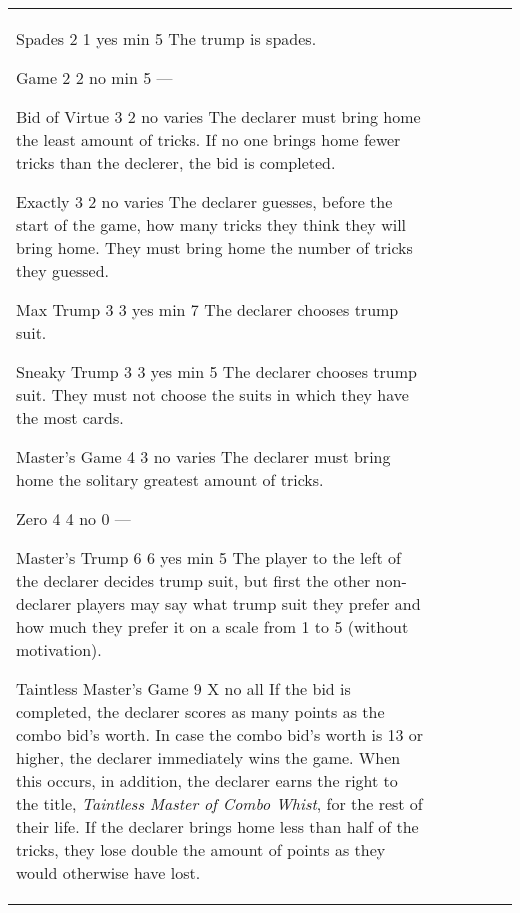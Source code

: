 \begin{table}
\begin{center}
\begin{tabularx}{\textwidth}{
			l
			S[table-number-alignment=center, table-format=1.0]
			S[table-number-alignment=center, table-format=1.0]
			cc|X
		}
				\standardBidItem%
				{Spades}
				{2}
				{1}
				{yes}
				{min 5}
				{%
					The trump is spades.
				}

				\standardBidItem%
				{Game}
				{2}
				{2}
				{no}
				{min 5}
				{%
					---
				}

				\standardBidItem%
				{Bid of Virtue}
				{3}
				{2}
				{no}
				{varies}
				{%
					The declarer must bring home the least amount of tricks. If no one brings home fewer tricks than the declerer, the bid is completed.
				}

				\standardBidItem%
				{Exactly}
				{3}
				{2}
				{no}
				{varies}
				{%
					The declarer guesses, before the start of the game, how many tricks they think they will bring home. They must bring home the number of tricks they guessed.
				}

				\standardBidItem%
				{Max Trump}
				{3}
				{3}
				{yes}
				{min 7}
				{%
					The declarer chooses trump suit.
				}

				\standardBidItem%
				{Sneaky Trump}
				{3}
				{3}
				{yes}
				{min 5}
				{%
					The declarer chooses trump suit. They must not choose the suits in which they have the most cards.
				}

				\standardBidItem%
				{Master's Game}
				{4}
				{3}
				{no}
				{varies}
				{%
					The declarer must bring home the solitary greatest amount of tricks.
				}

				\standardBidItem%
				{Zero}
				{4}
				{4}
				{no}
				{0}
				{%
					---
				}

				\standardBidItem%
				{Master's Trump}
				{6}
				{6}
				{yes}
				{min 5}
				{%
					The player to the left of the declarer decides trump suit, but first the other non-declarer players may say what trump suit they prefer and how much they prefer it on a scale from 1 to 5 (without motivation).
				}

				\standardBidItem%
				{Taintless Master's Game}
				{9}
				{X}
				{no}
				{all}
				{%
					If the bid is completed, the declarer scores as many points as the combo bid's worth. In case the combo bid's worth is 13 or higher, the declarer immediately wins the game. When this occurs, in addition, the declarer earns the right to the title, \emph{Taintless Master of Combo Whist}, for the rest of their life. If the declarer brings home less than half of the tricks, they lose double the amount of points as they would otherwise have lost.
				}
		\end{tabularx}
	\end{center}
\end{table}
